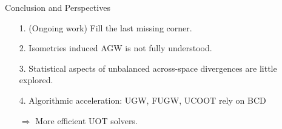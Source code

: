 \documentclass{beamer}
\begin{document}
\begin{frame}{Conclusion and Perspectives}
\vspace{1cm}
{}
\begin{enumerate}
  \item[1.] (Ongoing work) Fill the last missing corner.
  \item[2.] Isometries induced AGW is not fully understood.
  \item[3.] Statistical aspects of unbalanced across-space divergences
  are little explored.
  \item[4.] Algorithmic acceleration: UGW, FUGW, UCOOT rely on BCD

  $\Rightarrow$ More efficient UOT solvers.

\end{enumerate}

\end{frame}
\end{document}

